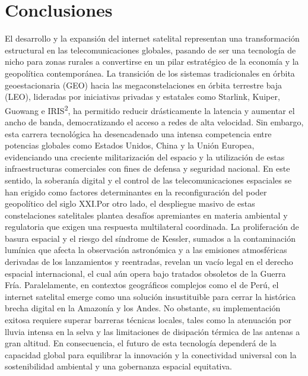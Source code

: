 \section{Conclusiones}
El desarrollo y la expansión del internet satelital representan una transformación estructural en las telecomunicaciones globales, pasando de ser una tecnología de nicho para zonas rurales a convertirse en un pilar estratégico de la economía y la geopolítica contemporánea. 
La transición de los sistemas tradicionales en órbita geoestacionaria (GEO) hacia las megaconstelaciones en órbita terrestre baja (LEO), lideradas por iniciativas privadas y estatales como Starlink, Kuiper, Guowang e IRIS\textsuperscript{2}, ha permitido reducir drásticamente la latencia y aumentar el ancho de banda, democratizando el acceso a redes de alta velocidad.
Sin embargo, esta carrera tecnológica ha desencadenado una intensa competencia entre potencias globales como Estados Unidos, China y la Unión Europea, evidenciando una creciente militarización del espacio y la utilización de estas infraestructuras comerciales con fines de defensa y seguridad nacional. 
En este sentido, la soberanía digital y el control de las telecomunicaciones espaciales se han erigido como factores determinantes en la reconfiguración del poder geopolítico del siglo XXI.Por otro lado, el despliegue masivo de estas constelaciones satelitales plantea desafíos apremiantes en materia ambiental y regulatoria que exigen una respuesta multilateral coordinada. 
La proliferación de basura espacial y el riesgo del síndrome de Kessler, sumados a la contaminación lumínica que afecta la observación astronómica y a las emisiones atmosféricas derivadas de los lanzamientos y reentradas, revelan un vacío legal en el derecho espacial internacional, el cual aún opera bajo tratados obsoletos de la Guerra Fría. 
Paralelamente, en contextos geográficos complejos como el de Perú, el internet satelital emerge como una solución insustituible para cerrar la histórica brecha digital en la Amazonía y los Andes. No obstante, su implementación exitosa requiere superar barreras técnicas locales, tales como la atenuación por lluvia intensa en la selva y las limitaciones de disipación térmica de las antenas a gran altitud. En consecuencia, el futuro de esta tecnología dependerá de la capacidad global para equilibrar la innovación y la conectividad universal con la sostenibilidad ambiental y una gobernanza espacial equitativa.